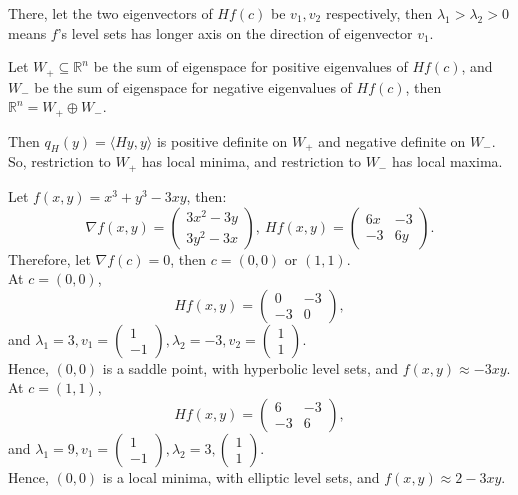 \documentclass[11pt]{article}
\newenvironment{example}[1]{\begin{exbox}{#1}{}}{\end{exbox}}
\theoremstyle{quiet}
\theoremstyle{quietremark}
\begin{document}
There, let the two eigenvectors of $Hf(c)$ be $v_1,v_2$ respectively, then $\lambda_1>\lambda_2>0$ means $f$'s level sets has longer axis on the direction of eigenvector $v_1$.

Let $W_+\subseteq\mathbb{R}^n$ be the sum of eigenspace for positive eigenvalues of $Hf(c)$, and $W_-$ be the sum of eigenspace for negative eigenvalues of $Hf(c)$, then $\mathbb{R}^n=W_+\oplus W_-$.

Then $q_H(y)=\langle Hy,y\rangle$ is positive definite on $W_+$ and negative definite on $W_-$. So, restriction to $W_+$ has local minima, and restriction to $W_-$ has local maxima.

\begin{example}{}
Let $f(x,y)=x^3+y^3-3xy$, then:
\[
\nabla f(x,y)=\begin{pmatrix}3x^2-3y\\3y^2-3x\end{pmatrix},~Hf(x,y)=\begin{pmatrix}6x&-3\\-3&6y\end{pmatrix}.
\]
Therefore, let $\nabla f(c)=0$, then $c=(0,0)$ or $(1,1)$.\\
At $c=(0,0)$, 
\[
Hf(x,y)=\begin{pmatrix}0&-3\\-3&0\end{pmatrix},
\] 
and $\lambda_1=3,v_1=\begin{pmatrix}1\\-1\end{pmatrix}, \lambda_2=-3,v_2=\begin{pmatrix}1\\1\end{pmatrix}$. \\
Hence, $(0,0)$ is a saddle point, with hyperbolic level sets, and $f(x,y)\approx -3xy.$\\
At $c=(1,1)$, 
\[
Hf(x,y)=\begin{pmatrix}6&-3\\-3&6\end{pmatrix},
\]
and $\lambda_1=9, v_1=\begin{pmatrix}1\\-1\end{pmatrix},\lambda_2=3,\begin{pmatrix}1\\1\end{pmatrix}$.\\
Hence, $(0,0)$ is a local minima, with elliptic level sets, and $f(x,y)\approx2-3xy.$
\end{example}
\end{document}
